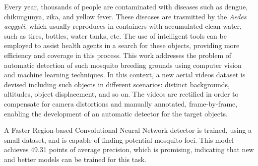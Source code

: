 \begin{foreignabstract}

Every year, thousands of people are contaminated with diseases such as dengue, chikungunya, zika, and yellow fever.
These diseases are trasmitted by the {\it Aedes aegypti}, which usually reproduces in containers with accumulated clean water, such as tires, bottles, water tanks, etc.
The use of intelligent tools can be employed to assist health agents in a search for these objects, providing more efficiency and coverage in this process.
This work addresses the problem of automatic detection of such mosquito breeding grounds using computer vision and machine learning techniques.
In this context, a new aerial videos dataset is devised including such objects in different scenarios: distinct backgrounds, altitudes, object displacement, and so on.
The videos are rectified in order to compensate for camera distortions and manually annotated, frame-by-frame, enabling the development of an automatic detector for the target objects.

A Faster Region-based Convolutional Neural Network detector is trained, using a small dataset, and is capable of finding potential mosquito foci.
This model achieves 49.31 points of average precision, which is promising, indicating that new and better models can be trained for this task.


\end{foreignabstract}


